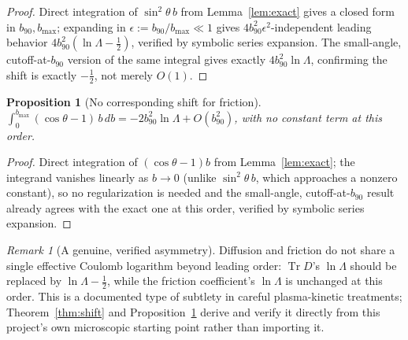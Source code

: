 \documentclass[12pt]{amsart}
\theoremstyle{plain}
\newtheorem{proposition}[theorem]{Proposition}
\theoremstyle{remark}
\newtheorem*{remark}{Remark}
\begin{document}
\begin{proof}
Direct integration of $\sin^2\theta\,b$ from Lemma~\ref{lem:exact} gives a closed form in $b_{90},b_{\max}$; expanding in $\epsilon:=b_{90}/b_{\max}\ll1$ gives $4b_{90}^2\epsilon^2$-independent leading behavior $4b_{90}^2(\ln\Lambda-\tfrac12)$, verified by symbolic series expansion. The small-angle, cutoff-at-$b_{90}$ version of the same integral gives exactly $4b_{90}^2\ln\Lambda$, confirming the shift is exactly $-\tfrac12$, not merely $O(1)$.
\end{proof}

\begin{proposition}[No corresponding shift for friction]\label{prop:noshift}
$\displaystyle\int_0^{b_{\max}}(\cos\theta-1)\,b\,db = -2b_{90}^2\ln\Lambda + O(b_{90}^2)$, with no constant term at this order.
\end{proposition}

\begin{proof}
Direct integration of $(\cos\theta-1)b$ from Lemma~\ref{lem:exact}; the integrand vanishes linearly as $b\to0$ (unlike $\sin^2\theta\,b$, which approaches a nonzero constant), so no regularization is needed and the small-angle, cutoff-at-$b_{90}$ result already agrees with the exact one at this order, verified by symbolic series expansion.
\end{proof}

\begin{remark}[A genuine, verified asymmetry]
Diffusion and friction do not share a single effective Coulomb logarithm beyond leading order: $\operatorname{Tr}D$'s $\ln\Lambda$ should be replaced by $\ln\Lambda-\tfrac12$, while the friction coefficient's $\ln\Lambda$ is unchanged at this order. This is a documented type of subtlety in careful plasma-kinetic treatments; Theorem~\ref{thm:shift} and Proposition~\ref{prop:noshift} derive and verify it directly from this project's own microscopic starting point rather than importing it.
\end{remark}
\end{document}

